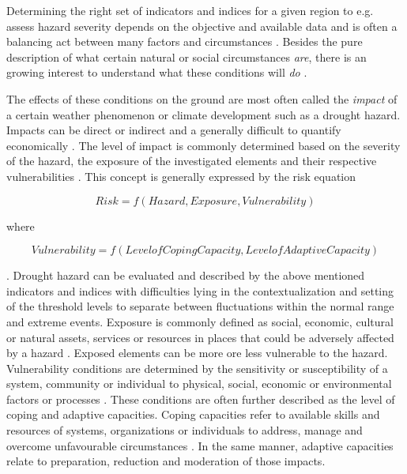 {Determining the right set of indicators and indices for a given region to e.g. assess hazard severity depends on the objective and available data and is often a balancing act between many factors and circumstances \autocite{svobodaHandbookDroughtIndicators2016}. Besides the pure description of what certain natural or social circumstances \textit{are}, there is an growing interest to understand what these conditions will \textit{do} \autocite{boultDroughtImpactbasedForecasting2022, lackstromBackyardHydroclimatologyCitizen2022}.

The effects of these conditions on the ground are most often called the \textit{impact} of a certain weather phenomenon or climate development such as a drought hazard. Impacts can be direct or indirect and a generally difficult to quantify economically \autocite{vereintenationenSpecialReportDrought2021}. The level of impact is commonly determined based on the severity of the hazard, the exposure of the investigated elements and their respective vulnerabilities \autocite{harrowsmithFutureForecastImpact2020,svobodaHandbookDroughtIndicators2016,vereintenationenSpecialReportDrought2021}.
This concept is generally expressed by the risk equation

        \[Risk = f(Hazard, Exposure, Vulnerability)\]

    where

        \[Vulnerability = f(Level of Coping Capacity, Level of Adaptive Capacity)\]

\autocite{boultDroughtImpactbasedForecasting2022,harrowsmithFutureForecastImpact2020,vereintenationenSpecialReportDrought2021}. Drought hazard can be evaluated and described by the above mentioned indicators and indices with difficulties lying in the contextualization and setting of the threshold levels to separate between fluctuations within the normal range and extreme events. Exposure is commonly defined as social, economic, cultural or natural assets, services or resources in places that could be adversely affected by a hazard \autocite{ipccClimateChange20142014}. Exposed elements can be more ore less vulnerable to the hazard. Vulnerability conditions are determined by the sensitivity or susceptibility of a system, community or individual to physical, social, economic or environmental factors or processes \autocite{ipccClimateChange20142014}. These conditions are often further described as the level of coping and adaptive capacities. Coping capacities refer to available skills and resources of systems, organizations or individuals to address, manage and overcome unfavourable circumstances \autocite{ipccGlossaryTerms2012}. In the same manner, adaptive capacities relate to preparation, reduction and moderation of those impacts.

}
